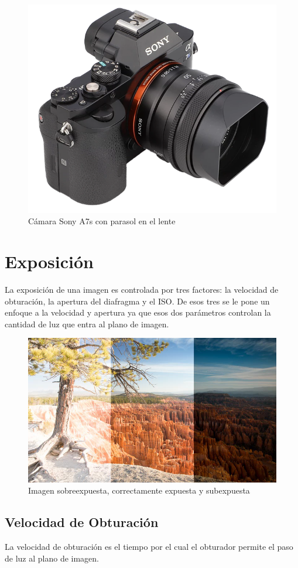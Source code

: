 \documentclass{article}
\begin{document}
\begin{figure}[H]
	\centering
	\includegraphics[width=0.55\linewidth]{Figuras/Lens_Hood}
	\caption{Cámara Sony A7s con parasol en el lente}
	\label{fig:lenshood}
\end{figure}



\section{Exposición}

La exposición de una imagen es controlada por tres factores: la velocidad de obturación, la apertura del diafragma y el ISO. De esos tres se le pone un enfoque a la velocidad y apertura ya que esos dos parámetros controlan la cantidad de luz que entra al plano de imagen.

\begin{figure}[H]
	\centering
	\includegraphics[width=0.65\linewidth]{Figuras/Exposure}
	\caption{Imagen sobreexpuesta, correctamente expuesta y subexpuesta}
	\label{fig:exposure}
\end{figure}

\subsection{Velocidad de Obturación}

La velocidad de obturación es el tiempo por el cual el obturador permite el paso de luz al plano de imagen.
\end{document}
